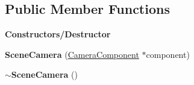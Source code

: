 \subsection*{Public Member Functions}
\begin{Indent}\textbf{ Constructors/\+Destructor}\par
\begin{DoxyCompactItemize}
\item 
\mbox{\label{classrev_1_1_scene_camera_af438f4b1e945cc544e26a84b2695be4d}} 
{\bfseries Scene\+Camera} (\mbox{\hyperlink{classrev_1_1_camera_component}{Camera\+Component}} $\ast$component)
\item 
\mbox{\label{classrev_1_1_scene_camera_ae8153dcca8fa4341898cb0510c00c5a5}} 
{\bfseries $\sim$\+Scene\+Camera} ()
\end{DoxyCompactItemize}
\end{Indent}
